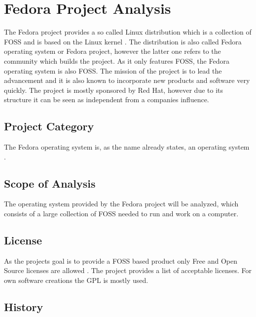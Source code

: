 
\section{Fedora Project Analysis} %


\noindent The Fedora project provides a so called Linux distribution which is a
collection of \ac{FOSS} and is based on the Linux kernel
\cite{FedoraAbout,FedoraTogami}. The distribution is also called Fedora
operating system or Fedora project, however the latter one refers to the
community which builds the project. As it only features \ac{FOSS}, the Fedora
operating system is also \ac{FOSS}. The mission of the project is to lead the
advancement and it is also known to incorporate new products and software very
quickly. The project is mostly sponsored by Red Hat, however due to its
structure it can be seen as independent from a companies influence.

\subsection{Project Category}

The Fedora operating system is, as the name already states, an operating system
\cite{FedoraAbout}.

\subsection{Scope of Analysis}

The operating system provided by the Fedora project will be analyzed, which
consists of a large collection of \ac{FOSS} needed to run and work on a
computer.

\subsection{License}

As the projects goal is to provide a \ac{FOSS} based product only Free and Open
Source licenses are allowed \cite{FedoraLicensing}. The project provides a list
of acceptable licenses. For own software creations the \ac{GPL} is mostly used.

\subsection{History}

